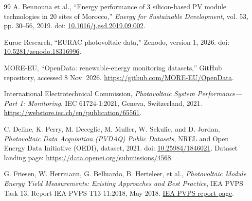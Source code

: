 \documentclass[preprint,12pt]{elsarticle}
\begin{document}
\begin{thebibliography}{99}
 A. Bennouna et al., ``Energy performance of 3 silicon-based PV module technologies in 20 sites of Morocco,'' \emph{Energy for Sustainable Development}, vol. 53, pp. 30--56, 2019. doi: \href{https://doi.org/10.1016/j.esd.2019.09.002}{10.1016/j.esd.2019.09.002}.

 Eurac Research, ``EURAC photovoltaic data,'' Zenodo, version 1, 2026. doi: \href{https://doi.org/10.5281/zenodo.18316996}{10.5281/zenodo.18316996}.

 MORE-EU, ``OpenData: renewable-energy monitoring datasets,'' GitHub repository, accessed 8 Nov. 2026. \url{https://github.com/MORE-EU/OpenData}.

 International Electrotechnical Commission, \emph{Photovoltaic System Performance---Part 1: Monitoring}, IEC 61724-1:2021, Geneva, Switzerland, 2021. \url{https://webstore.iec.ch/en/publication/65561}.

 C. Deline, K. Perry, M. Deceglie, M. Muller, W. Sekulic, and D. Jordan, \emph{Photovoltaic Data Acquisition (PVDAQ) Public Datasets}, NREL and Open Energy Data Initiative (OEDI), dataset, 2021. doi: \href{https://doi.org/10.25984/1846021}{10.25984/1846021}. Dataset landing page: \url{https://data.openei.org/submissions/4568}.

 G. Friesen, W. Herrmann, G. Belluardo, B. Herteleer, et al., \emph{Photovoltaic Module Energy Yield Measurements: Existing Approaches and Best Practice}, IEA PVPS Task 13, Report IEA-PVPS T13-11:2018, May 2018. \href{https://iea-pvps.org/key-topics/photovoltaic-module-energy-yield-measurements-existing-approaches-and-best-practice/}{IEA PVPS report page}.

\end{thebibliography}
\endgroup
\end{document}
